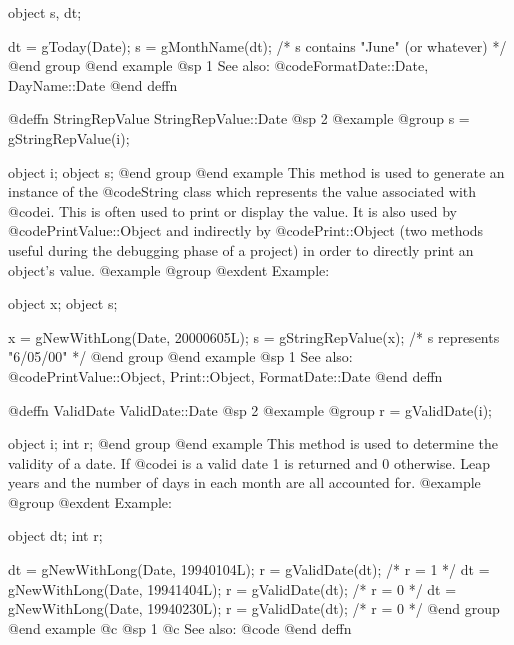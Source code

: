 object  s, dt;

dt = gToday(Date);
s = gMonthName(dt);   /*  s contains "June" (or whatever)  */
@end group
@end example
@sp 1
See also:  @code{FormatDate::Date, DayName::Date}
@end deffn










@deffn {StringRepValue} StringRepValue::Date
@sp 2
@example
@group
s = gStringRepValue(i);

object  i;
object  s;
@end group
@end example
This method is used to generate an instance of the @code{String} class
which represents the value associated with @code{i}.  This is often
used to print or display the value.  It is also used by
@code{PrintValue::Object} and indirectly by @code{Print::Object}
(two methods useful during the debugging phase of a project)
in order to directly print an object's value.
@example
@group
@exdent Example:

object  x;
object  s;

x = gNewWithLong(Date, 20000605L);
s = gStringRepValue(x);      /*  s represents "6/05/00"   */
@end group
@end example
@sp 1
See also:  @code{PrintValue::Object, Print::Object, FormatDate::Date}
@end deffn










@deffn {ValidDate} ValidDate::Date
@sp 2
@example
@group
r = gValidDate(i);

object  i;
int     r;
@end group
@end example
This method is used to determine the validity of a date.  If @code{i}
is a valid date 1 is returned and 0 otherwise.   Leap years and the
number of days in each month are all accounted for.
@example
@group
@exdent Example:

object  dt;
int     r;

dt = gNewWithLong(Date, 19940104L);
r = gValidDate(dt);   /*  r = 1  */
dt = gNewWithLong(Date, 19941404L);
r = gValidDate(dt);   /*  r = 0  */
dt = gNewWithLong(Date, 19940230L);
r = gValidDate(dt);   /*  r = 0  */
@end group
@end example
@c @sp 1
@c See also:  @code{}
@end deffn













